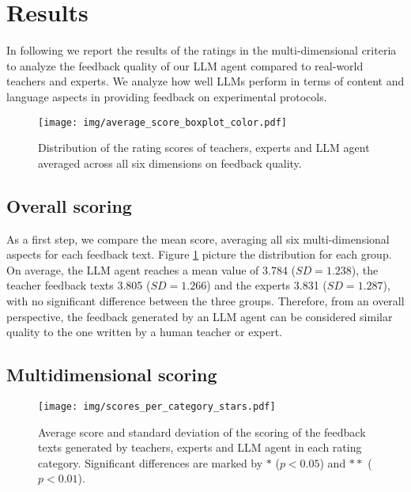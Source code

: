 \section{Results}

In following we report the results of the ratings in the multi-dimensional criteria to analyze the feedback quality of our LLM agent compared to real-world teachers and experts. We analyze how well LLMs perform in terms of content and language aspects in providing feedback on experimental protocols.

\begin{figure}[htbp]
    \centering
    \texttt{[image: img/average\_score\_boxplot\_color.pdf]}
    \caption{Distribution of the rating scores of teachers, experts and LLM agent averaged across all six dimensions on feedback quality.}
    \label{fig:average_scoring}
\end{figure}



\subsection{Overall scoring}\label{sec:overall_scoring}

As a first step, we compare the mean score, averaging all six multi-dimensional aspects for each feedback text. Figure \ref{fig:average_scoring} picture the distribution for each group. On average, the LLM agent reaches a mean value of 3.784 ($SD=1.238$), the teacher feedback texts 3.805 ($SD=1.266$) and the experts 3.831 ($SD=1.287$), with no significant difference between the three groups. Therefore, from an overall perspective, the feedback generated by an LLM agent can be considered similar quality to the one written by a human teacher or expert.




\subsection{Multidimensional scoring} \label{sec:multidim}

\begin{figure}[htbp]
    \centering
    \texttt{[image: img/scores\_per\_category\_stars.pdf]}
    \caption{Average score and standard deviation of the scoring of the feedback texts generated by teachers, experts and LLM agent in each rating category. Significant differences are marked by $*$ ($p<0.05$) and $**$ ($p<0.01$).}
    \label{fig:scores_categories}
\end{figure}


